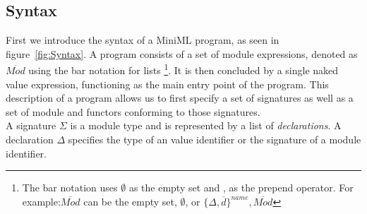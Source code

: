 \documentclass[10pt,a4paper]{report}
\begin{document}
\subsection{Syntax}
\newcommand{\longspace}{\;\;\;\;\;\;}
\newcommand{\inlinecode}{\texttt}
First we introduce the syntax of a \mbox{MiniML} program, as seen in figure~\ref{fig:Syntax}. A program consists of a set of module expressions, denoted as $\overline{\mathit{Mod}}$ using the bar notation for lists \footnote{The bar notation uses $\emptyset$ as the empty set and , as the prepend operator. For example:$\overline{\mathit{Mod}}$ can be the empty set, $\emptyset$, or $\lbrace \Delta, \overline{\mathit{d}}\rbrace^{name}, \overline{Mod}$}. It is then concluded by a single naked value expression, functioning as the main entry point of the program.
This description of a program allows us to first specify a set of signatures as well as a set of module and functors conforming to those signatures.
\\[2ex]
A signature $\Sigma$ is a module type and is represented by a list of \emph{declarations}. A declaration $\Delta$ specifies the type of an value identifier or the signature of a module identifier.
\end{document}
